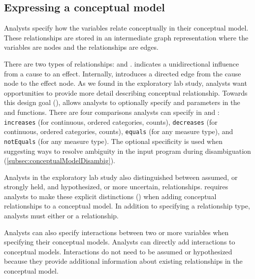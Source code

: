\subsection{Expressing a conceptual model}
Analysts specify how the variables relate conceptually in their conceptual
model. These relationships are stored in an intermediate graph representation
where the variables are nodes and the relationships are edges. 

There are two types of relationships: \causes and \relates. \causes indicates a
unidirectional influence from a cause to an effect. %
Internally,
\causes introduces a directed edge from the cause node to the effect node. As we
found in the exploratory lab study, analysts want opportunities to provide more
detail describing conceptual relationship. Towards this design goal
(\optionalSpecificity), \rTisane allows analysts to optionally specify \when and
\then parameters in the \causes and \relates functions. %
There are four comparisons analysts can specify in \when and \then:
\texttt{increases} (for continuous, ordered categories, counts),
\texttt{decreases} (for continuous, ordered categories, counts), \texttt{equals}
(for any measure type), and \texttt{notEquals} (for any measure type). The
optional specificity is used when suggesting ways to resolve ambiguity in the
input program during disambiguation (\autoref{subsec:conceptualModelDisambig}).

Analysts in the exploratory lab study also distinguished between assumed, or
strongly held, and hypothesized, or more uncertain, relationships. \rTisane
requires analysts to make these explicit distinctions (\assumeHypothesize) when
adding conceptual relationships to a conceptual model. In addition to specifying
a relationship type, analysts must either \assume or \hypothesize a relationship.


Analysts can also specify interactions between two or more variables when
specifying their conceptual models. %
Analysts can directly add interactions to conceptual models. Interactions do not
need to be assumed or hypothesized because they provide additional information
about existing relationships in the conceptual model. 


